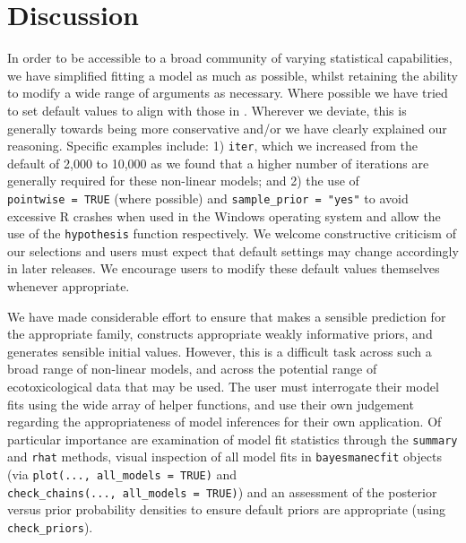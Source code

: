 \documentclass[
  shortnames]{jss}
\begin{document}
\newpage

\hypertarget{discussion}{%
\section{Discussion}\label{discussion}}

In order to be accessible to a broad community of varying statistical capabilities, we have simplified fitting a  model as much as possible, whilst retaining the ability to modify a wide range of arguments as necessary. Where possible we have tried to set default values to align with those in . Wherever we deviate, this is generally towards being more conservative and/or we have clearly explained our reasoning. Specific examples include: 1) \texttt{iter}, which we increased from the  default of 2,000 to 10,000 as we found that a higher number of iterations are generally required for these non-linear models; and 2) the use of \texttt{pointwise\ =\ TRUE} (where possible) and \texttt{sample\_prior\ =\ "yes"} to avoid excessive R crashes when used in the Windows operating system and allow the use of the \texttt{hypothesis} function respectively. We welcome constructive criticism of our selections and users must expect that default settings may change accordingly in later releases. We encourage users to modify these default values themselves whenever appropriate.

We have made considerable effort to ensure that  makes a sensible prediction for the appropriate family, constructs appropriate weakly informative priors, and generates sensible initial values. However, this is a difficult task across such a broad range of non-linear models, and across the potential range of ecotoxicological data that may be used. The user must interrogate their model fits using the wide array of helper functions, and use their own judgement regarding the appropriateness of model inferences for their own application. Of particular importance are examination of model fit statistics through the \texttt{summary} and \texttt{rhat} methods, visual inspection of all model fits in \texttt{bayesmanecfit} objects (via \texttt{plot(...,\ all\_models\ =\ TRUE)} and \texttt{check\_chains(...,\ all\_models\ =\ TRUE)}) and an assessment of the posterior versus prior probability densities to ensure default priors are appropriate (using \texttt{check\_priors}).
\end{document}
